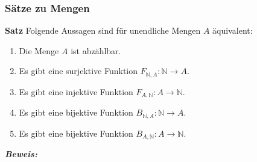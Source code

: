 \subsubsection{Sätze zu Mengen}%
\label{ssub:sätze_zu_mengen}
\textbf{Satz } 	
    Folgende Aussagen sind für unendliche Mengen $A$ äquivalent:
    \begin{enumerate}
        \item Die Menge $A$ ist abzählbar.
        \item Es gibt eine surjektive Funktion $F_{\mathbb{N},A}:\mathbb{N}\to A$.
        \item Es gibt eine injektive Funktion $F_{A,\mathbb{N}}:A\to\mathbb{N}$.
        \item Es gibt eine bijektive Funktion $B_{\mathbb{N},A}:\mathbb{N}\to A$.
        \item Es gibt eine bijektive Funktion $B_{A,\mathbb{N}}:A\to\mathbb{N}$.
    \end{enumerate}
   \textit{\textbf{Beweis: }} 
